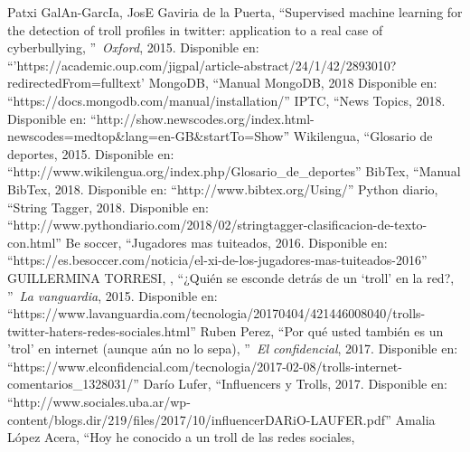 \documentclass[../all.tex]{subfiles}
\begin{document}
\begin{thebibliography}{37}
		Patxi GalAn-GarcIa, JosE Gaviria de la Puerta, 
		\textquotedblleft Supervised machine learning for the detection of troll profiles in twitter: application to a real case of cyberbullying,
		\textquotedblright\ \textit{Oxford},
		2015.
		Disponible en: ``'https://academic.oup.com/jigpal/article-abstract/24/1/42/2893010?redirectedFrom=fulltext'
		MongoDB, 
		\textquotedblleft Manual MongoDB,
		2018
		Disponible en: ``https://docs.mongodb.com/manual/installation/''
		IPTC, 
		\textquotedblleft News Topics,
		2018.
		Disponible en: ``http://show.newscodes.org/index.html-newscodes=medtop\&lang=en-GB\&startTo=Show''
		Wikilengua, 
		\textquotedblleft Glosario de deportes,
		2015.
		Disponible en: ``http://www.wikilengua.org/index.php/Glosario\_de\_deportes''
		 BibTex, 
		\textquotedblleft Manual BibTex,
		2018.
		Disponible en: ``http://www.bibtex.org/Using/''
		Python diario, 
		\textquotedblleft String Tagger,
		2018.
		Disponible en: ``http://www.pythondiario.com/2018/02/stringtagger-clasificacion-de-texto-con.html''
		Be soccer, 
		\textquotedblleft Jugadores mas tuiteados,
		2016.
		Disponible en: ``https://es.besoccer.com/noticia/el-xi-de-los-jugadores-mas-tuiteados-2016''
		GUILLERMINA TORRESI, , 
		\textquotedblleft ¿Quién se esconde detrás de un ‘troll’ en la red?,
		\textquotedblright\ \textit{La vanguardia},
		2015.
		Disponible en: ``https://www.lavanguardia.com/tecnologia/20170404/421446008040/trolls-twitter-haters-redes-sociales.html''
		Ruben Perez, 
		\textquotedblleft Por qué usted también es un 'trol' en internet (aunque aún no lo sepa),
		\textquotedblright\ \textit{El confidencial},
		2017.
		Disponible en: ``https://www.elconfidencial.com/tecnologia/2017-02-08/trolls-internet-comentarios\_1328031/''
		Darío Lufer, 
		\textquotedblleft Influencers y Trolls,
		2017.
		Disponible en: ``http://www.sociales.uba.ar/wp-content/blogs.dir/219/files/2017/10/influencerDARiO-LAUFER.pdf''
		Amalia López Acera, 
		\textquotedblleft Hoy he conocido a un troll de las redes sociales,

\end{thebibliography}
\end{document}
